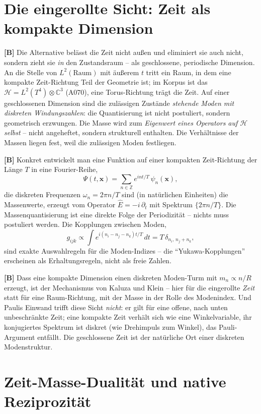 \section{Die eingerollte Sicht: Zeit als kompakte Dimension}

\textbf{[B]} Die Alternative belässt die Zeit nicht außen und eliminiert sie auch
nicht, sondern zieht sie \emph{in} den Zustandsraum -- als geschlossene,
periodische Dimension. An die Stelle von $L^2(\text{Raum})$ mit äußerem $t$ tritt
ein Raum, in dem eine kompakte Zeit-Richtung Teil der Geometrie ist; im Korpus ist
das $\mathcal H = L^2(T^4)\otimes\mathbb{C}^3$ (A070), eine Torus-Richtung trägt
die Zeit. Auf einer geschlossenen Dimension sind die zulässigen Zustände
\emph{stehende Moden mit diskreten Windungszahlen}: die Quantisierung ist nicht
postuliert, sondern geometrisch erzwungen. Die Masse wird zum \emph{Eigenwert
eines Operators auf $\mathcal H$ selbst} -- nicht angeheftet, sondern strukturell
enthalten. Die Verhältnisse der Massen liegen fest, weil die zulässigen Moden
festliegen.

\textbf{[B]} Konkret entwickelt man eine Funktion auf einer kompakten
Zeit-Richtung der Länge $T$ in eine Fourier-Reihe,
\[
  \Psi(t,\mathbf x) = \sum_{n\in\mathbb Z} e^{i n t/T}\,\psi_n(\mathbf x),
\]
die diskreten Frequenzen $\omega_n = 2\pi n/T$ sind (in natürlichen Einheiten) die
Massenwerte, erzeugt vom Operator $\hat E = -i\,\partial_t$ mit Spektrum
$\{2\pi n/T\}$. Die Massenquantisierung ist eine direkte Folge der Periodizität --
nichts muss postuliert werden. Die Kopplungen zwischen Moden,
\[
  g_{ijk} \propto \int e^{i(n_i-n_j-n_k)t/T}\,dt = T\,\delta_{n_i,\,n_j+n_k},
\]
sind exakte Auswahlregeln für die Moden-Indizes -- die \enquote{Yukawa-Kopplungen}
erscheinen als Erhaltungsregeln, nicht als freie Zahlen.

\textbf{[B]} Dass eine kompakte Dimension einen diskreten Moden-Turm mit
$m_n\propto n/R$ erzeugt, ist der Mechanismus von Kaluza und Klein -- hier für die
eingerollte \emph{Zeit} statt für eine Raum-Richtung, mit der Masse in der Rolle
des Modenindex. Und Paulis Einwand trifft diese Sicht \emph{nicht}: er gilt für
eine offene, nach unten unbeschränkte Zeit; eine kompakte Zeit verhält sich wie
eine Winkelvariable, ihr konjugiertes Spektrum ist diskret (wie Drehimpuls zum
Winkel), das Pauli-Argument entfällt. Die geschlossene Zeit ist der natürliche Ort
einer diskreten Modenstruktur.

\section{Zeit-Masse-Dualität und native Reziprozität}

